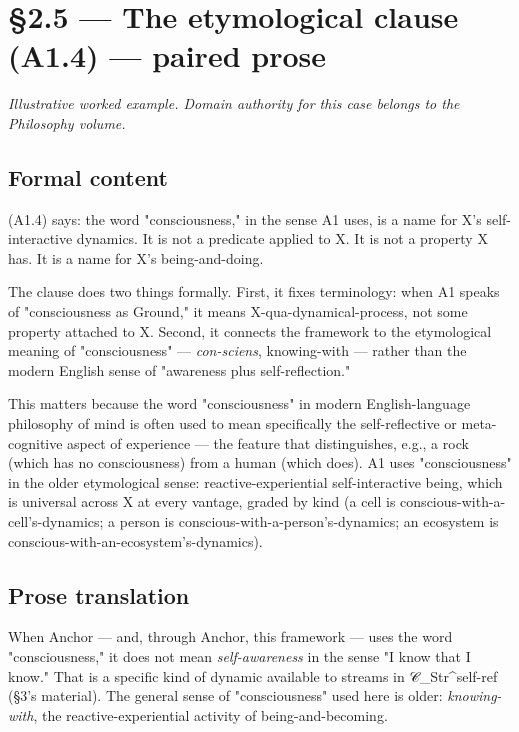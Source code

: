 \documentclass[11pt, openany]{book}
\newcommand{\sectionbreak}{\clearpage}
\begin{document}
\sectionbreak

\section{§2.5 --- The etymological clause (A1.4) --- paired prose}

\textit{Illustrative worked example. Domain authority for this case belongs to the Philosophy volume.}

\subsection{Formal content}

(A1.4) says: the word "consciousness," in the sense A1 uses, is a name for X's self-interactive dynamics. It is not a predicate applied to X. It is not a property X has. It is a name for X's being-and-doing.

The clause does two things formally. First, it fixes terminology: when A1 speaks of "consciousness as Ground," it means X-qua-dynamical-process, not some property attached to X. Second, it connects the framework to the etymological meaning of "consciousness" --- \textit{con-sciens}, knowing-with --- rather than the modern English sense of "awareness plus self-reflection."

This matters because the word "consciousness" in modern English-language philosophy of mind is often used to mean specifically the self-reflective or meta-cognitive aspect of experience --- the feature that distinguishes, e.g., a rock (which has no consciousness) from a human (which does). A1 uses "consciousness" in the older etymological sense: reactive-experiential self-interactive being, which is universal across X at every vantage, graded by kind (a cell is conscious-with-a-cell's-dynamics; a person is conscious-with-a-person's-dynamics; an ecosystem is conscious-with-an-ecosystem's-dynamics).

\subsection{Prose translation}

When Anchor --- and, through Anchor, this framework --- uses the word "consciousness," it does not mean \textit{self-awareness} in the sense "I know that I know." That is a specific kind of dynamic available to streams in 𝒞\_\allowbreak{}Str\textasciicircum{}self-ref (§3's material). The general sense of "consciousness" used here is older: \textit{knowing-with}, the reactive-experiential activity of being-and-becoming.
\end{document}
